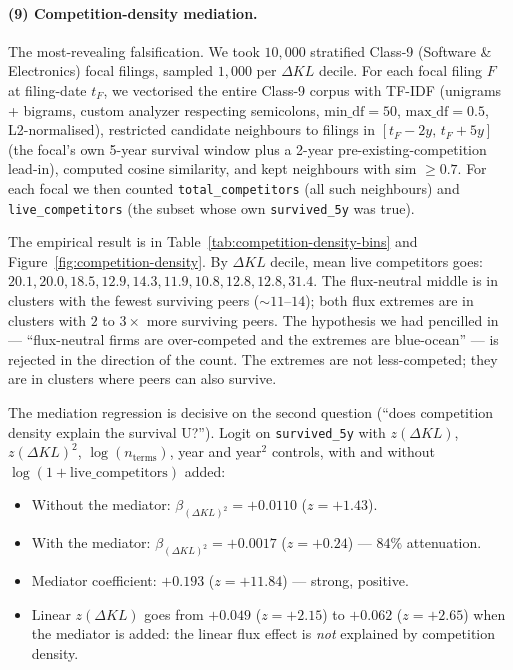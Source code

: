 \documentclass[11pt]{article}
\begin{document}
\paragraph{(9) Competition-density mediation.}
The most-revealing falsification. We took $10{,}000$ stratified
Class-9 (Software \& Electronics) focal filings, sampled $1{,}000$
per $\Delta KL$ decile. For each focal filing $F$ at filing-date
$t_F$, we vectorised the entire Class-9 corpus with TF-IDF
(unigrams + bigrams, custom analyzer respecting semicolons,
$\text{min\_df} = 50$, $\text{max\_df} = 0.5$, L2-normalised),
restricted candidate neighbours to filings in $[t_F - 2y,\,
t_F + 5y]$ (the focal's own 5-year survival window plus a 2-year
pre-existing-competition lead-in), computed cosine similarity, and
kept neighbours with sim $\geq 0.7$. For each focal we then counted
\texttt{total\_competitors} (all such neighbours) and
\texttt{live\_competitors} (the subset whose own \texttt{survived\_5y}
was true).

The empirical result is in Table~\ref{tab:competition-density-bins}
and Figure~\ref{fig:competition-density}. By $\Delta KL$ decile, mean
live competitors goes:
$20.1, 20.0, 18.5, 12.9, 14.3, 11.9, 10.8, 12.8, 12.8, 31.4$.
The flux-neutral middle is in clusters with the fewest surviving
peers ($\sim 11$--$14$); both flux extremes are in clusters with $2$
to $3\times$ more surviving peers. The hypothesis we had pencilled in
--- ``flux-neutral firms are over-competed and the extremes are
blue-ocean'' --- is rejected in the direction of the count. The
extremes are not less-competed; they are in clusters where peers can
also survive.

\begin{table}[h]
\centering
\caption{Live-competitor density by $\Delta KL$ decile on $10{,}000$
stratified Class-9 focal filings. The flux-neutral middle has the
fewest live peers; both flux extremes have $2$--$3\times$ more.}
\label{tab:competition-density-bins}

\end{table}

The mediation regression is decisive on the second question
(``does competition density explain the survival U?''). Logit on
\texttt{survived\_5y} with $z(\Delta KL)$, $z(\Delta KL)^2$,
$\log(n_\text{terms})$, year and year$^2$ controls, with and without
$\log(1 + \text{live\_competitors})$ added:
\begin{itemize}
  \item Without the mediator: $\beta_{(\Delta KL)^2} = +0.0110$
        ($z = +1.43$).
  \item With the mediator: $\beta_{(\Delta KL)^2} = +0.0017$
        ($z = +0.24$) --- $84\%$ attenuation.
  \item Mediator coefficient: $+0.193$ ($z = +11.84$) --- strong,
        positive.
  \item Linear $z(\Delta KL)$ goes from $+0.049$ ($z = +2.15$) to
        $+0.062$ ($z = +2.65$) when the mediator is added: the
        linear flux effect is \emph{not} explained by competition
        density.
\end{itemize}
\end{document}

